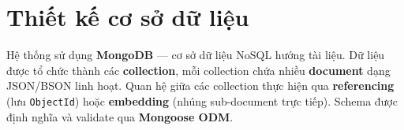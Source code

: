 
\section{Thiết kế cơ sở dữ liệu}
\label{sec:database_design}

Hệ thống sử dụng \textbf{MongoDB} --- cơ sở dữ liệu NoSQL hướng tài liệu. Dữ liệu được tổ chức thành các \textbf{collection}, mỗi collection chứa nhiều \textbf{document} dạng JSON/BSON linh hoạt. Quan hệ giữa các collection thực hiện qua \textbf{referencing} (lưu \texttt{ObjectId}) hoặc \textbf{embedding} (nhúng sub-document trực tiếp). Schema được định nghĩa và validate qua \textbf{Mongoose ODM}.


